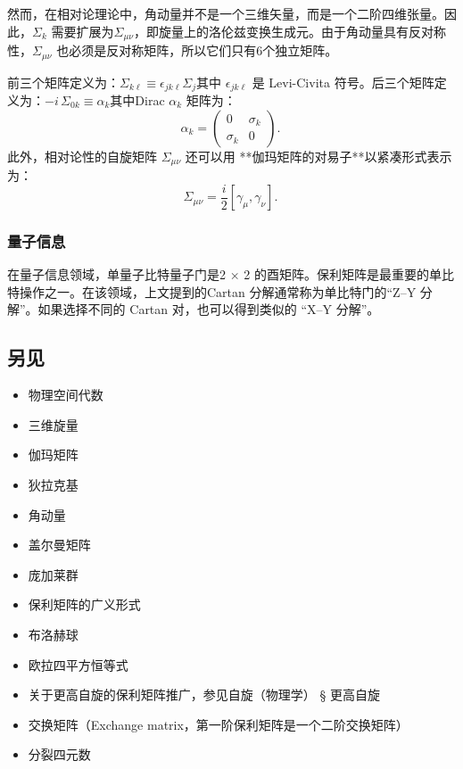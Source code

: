 然而，在相对论理论中，角动量并不是一个三维矢量，而是一个二阶四维张量。因此，$\Sigma_k$ 需要扩展为$\Sigma_{\mu\nu}$，即旋量上的洛伦兹变换生成元。由于角动量具有反对称性，$\Sigma_{\mu\nu}$ 也必须是反对称矩阵，所以它们只有6个独立矩阵。

前三个矩阵定义为：$\Sigma_{k\ell} \equiv \epsilon_{jk\ell} \Sigma_j$其中 $\epsilon_{jk\ell}$ 是 Levi-Civita 符号。后三个矩阵定义为：$-i \, \Sigma_{0k} \equiv \alpha_k$其中Dirac $\alpha_k$ 矩阵为：
  $$
  \alpha_k =
  \begin{pmatrix}
  0 & \sigma_k \\
  \sigma_k & 0
  \end{pmatrix}.~
  $$
此外，相对论性的自旋矩阵 $\Sigma_{\mu\nu}$ 还可以用 **伽玛矩阵的对易子**以紧凑形式表示为：
$$
\Sigma_{\mu\nu} = \frac{i}{2} [\gamma_\mu, \gamma_\nu].~
$$
\subsubsection{量子信息}
在量子信息领域，单量子比特量子门是2 × 2 的酉矩阵。保利矩阵是最重要的单比特操作之一。在该领域，上文提到的Cartan 分解通常称为单比特门的“Z–Y 分解”。如果选择不同的 Cartan 对，也可以得到类似的 “X–Y 分解”。
\subsection{另见}
\begin{itemize}
\item 物理空间代数
\item 三维旋量
\item 伽玛矩阵
\item 狄拉克基
\item 角动量
\item 盖尔曼矩阵
\item 庞加莱群
\item 保利矩阵的广义形式
\item 布洛赫球
\item 欧拉四平方恒等式
\item 关于更高自旋的保利矩阵推广，参见自旋（物理学） § 更高自旋
\item 交换矩阵（Exchange matrix，第一阶保利矩阵是一个二阶交换矩阵）
\item 分裂四元数
\end{itemize}
